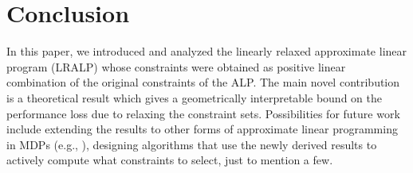 \section{Conclusion}
In this paper, we introduced and analyzed the linearly relaxed approximate linear program (LRALP) whose constraints were obtained as positive linear combination of the original constraints of the ALP. 
The main novel contribution is a theoretical result which gives a geometrically interpretable bound on the performance loss due to relaxing the constraint sets. Possibilities for future work include extending the results to other forms of approximate linear programming in MDPs (e.g., \citep{SALP}), designing algorithms that use the newly derived results to actively compute what constraints to select, just to mention a few.
\begin{comment}
The approximate linear program (ALP) is a widely employed method to handle MDPs with large number of states. However, an important shortcoming of the ALP is that it has large number of constraints, which is tackled in practice by sampling a tractable number of constraints from the ALP to formulate and solve a reduced linear program (RLP). The RLP has been found to work well empirically in various domains ranging from queues to Tetris games, and performance guarantees are for a specific RLP formulated under idealized assumptions. Alternatively, function approximation in the dual variables of the ALP has been another approach that has been employed in literature \cite{ALP-Bor,dolgov} to address the issue of large number of constraints. However there was no prior theoretical characterization for the function approximation of the dual variables.\par
In this paper, we introduced a novel framework based on the generalized reduced linear program formulation. The constraints of the GRLP were obtained as positive linear combinations of the original ALP. We provided an error bound that relates the optimal value function to the solution of the GRLP. Our error bound contained two terms, one inherent to the ALP formulation and the other due to constraint reduction. We also made qualitative and quantitative observations about the nature of the error term that arose due to constraint reduction.
In particular, we also theoretically justified linear function approximation of the constraints. We also discussed the results and provided a numerical example in the domain of controlled queues. To conclude, we observe that by providing a novel theoretical framework to study constraint approximation, this paper provides important results that add to the theory of ALP.
\end{comment}

